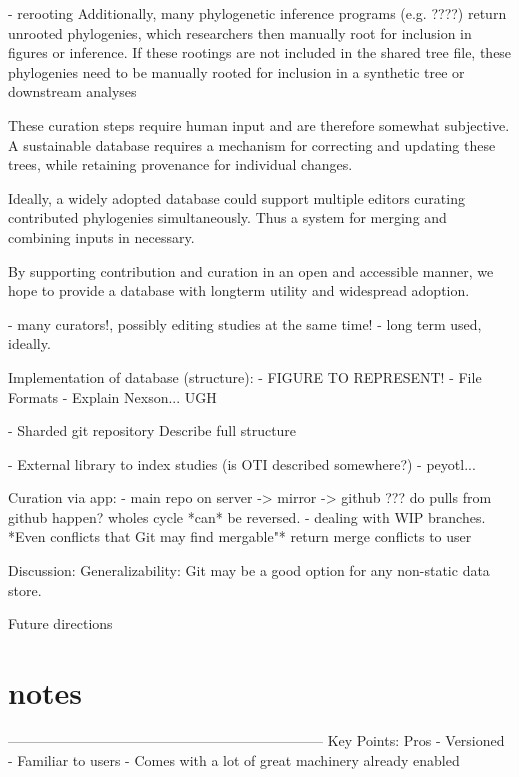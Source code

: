 \documentclass[a4paper,10pt]{article}
\begin{document}
          - rerooting
Additionally, many phylogenetic inference programs (e.g. ????) return unrooted phylogenies, 
which researchers then manually root for inclusion in figures or inference. 
If these rootings are not included in the shared tree file, 
these phylogenies need to be manually rooted for inclusion in a synthetic tree or downstream analyses

These curation steps require human input and are therefore somewhat subjective.
A sustainable database requires a mechanism for correcting and updating these trees,
while retaining provenance for individual changes.

Ideally, a widely adopted database could support multiple editors curating contributed phylogenies simultaneously.
Thus a system for merging and combining inputs in necessary.

By supporting contribution and curation in an open and accessible manner, we hope to provide a database with longterm utility and widespread adoption.

          - many curators!, possibly editing studies at the same time!
          - long term used, ideally.

           Implementation of database (structure):
      - FIGURE TO REPRESENT!
      - File Formats
         - Explain Nexson... UGH
         
      - Sharded git repository
          Describe full structure 
          
      - External library to index studies (is OTI described somewhere?)
      - peyotl...
      
      Curation via app:
        - main repo on server -> mirror -> github
            ??? do pulls from github happen? wholes cycle *can* be reversed.
        - dealing with WIP branches.
        *Even conflicts that Git may find mergable"*
        return merge conflicts to user

 Discussion:
   Generalizability:
      Git may be a good option for any non-static data store.
      
  Future directions

  
  



\section{notes}
  --------------------------------------------------------------------
Key Points:
Pros
 - Versioned
 - Familiar to users
 - Comes with a lot of great machinery already enabled
\end{document}
